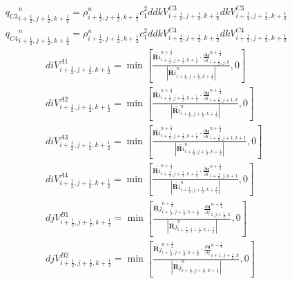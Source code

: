 \begin{enumerate}
\begin{eqnarray}
		{q_{C3}}^{n}_{i+\frac{1}{2},j+\frac{1}{2},k+\frac{1}{2}}=\rho^{n}_{i+\frac{1}{2},j+\frac{1}{2},k+\frac{1}{2}}c_1^2ddkV^{C3}_{i+\frac{1}{2},j+\frac{1}{2},k+\frac{1}{2}}dkV^{C3}_{i+\frac{1}{2},j+\frac{1}{2},k+\frac{1}{2}}\\
		{q_{C4}}^{n}_{i+\frac{1}{2},j+\frac{1}{2},k+\frac{1}{2}}=\rho^{n}_{i+\frac{1}{2},j+\frac{1}{2},k+\frac{1}{2}}c_1^2ddkV^{C4}_{i+\frac{1}{2},j+\frac{1}{2},k+\frac{1}{2}}dkV^{C4}_{i+\frac{1}{2},j+\frac{1}{2},k+\frac{1}{2}}
	\end{eqnarray}
\small
	\begin{eqnarray*}
		&&diV^{A1}_{i+\frac{1}{2},j+\frac{1}{2},k+\frac{1}{2}}=\min{\left[\frac{\bar{\bm Ri}^{n+\frac{1}{2}}_{i+\frac{1}{2},j+\frac{1}{2},k+\frac{1}{2}}\cdot{\frac{\partial \bm u}{\partial i}}^{n+\frac{1}{2}}_{i+\frac{1}{2},j,k}}{\left|\bar{\bm Ri}^n_{i+\frac{1}{2},j+\frac{1}{2},k+\frac{1}{2}}\right|},0\right]}\\
		&&diV^{A2}_{i+\frac{1}{2},j+\frac{1}{2},k+\frac{1}{2}}=\min{\left[\frac{\bar{\bm Ri}^{n+\frac{1}{2}}_{i+\frac{1}{2},j+\frac{1}{2},k+\frac{1}{2}}\cdot{\frac{\partial \bm u}{\partial i}}^{n+\frac{1}{2}}_{i+\frac{1}{2},j+1,k}}{\left|\bar{\bm Ri}^n_{i+\frac{1}{2},j+\frac{1}{2},k+\frac{1}{2}}\right|},0\right]}\\
		&&diV^{A3}_{i+\frac{1}{2},j+\frac{1}{2},k+\frac{1}{2}}=\min{\left[\frac{\bar{\bm Ri}^{n+\frac{1}{2}}_{i+\frac{1}{2},j+\frac{1}{2},k+\frac{1}{2}}\cdot{\frac{\partial \bm u}{\partial i}}^{n+\frac{1}{2}}_{i+\frac{1}{2},j+1,k+1}}{\left|\bar{\bm Ri}^n_{i+\frac{1}{2},j+\frac{1}{2},k+\frac{1}{2}}\right|},0\right]}\\
		&&diV^{A4}_{i+\frac{1}{2},j+\frac{1}{2},k+\frac{1}{2}}=\min{\left[\frac{\bar{\bm Ri}^{n+\frac{1}{2}}_{i+\frac{1}{2},j+\frac{1}{2},k+\frac{1}{2}}\cdot{\frac{\partial \bm u}{\partial i}}^{n+\frac{1}{2}}_{i+\frac{1}{2},j,k+1}}{\left|\bar{\bm Ri}^n_{i+\frac{1}{2},j+\frac{1}{2},k+\frac{1}{2}}\right|},0\right]}\\
		&&djV^{B1}_{i+\frac{1}{2},j+\frac{1}{2},k+\frac{1}{2}}=\min{\left[\frac{\bar{\bm Rj}^{n+\frac{1}{2}}_{i+\frac{1}{2},j+\frac{1}{2},k+\frac{1}{2}}\cdot{\frac{\partial \bm u}{\partial j}}^{n+\frac{1}{2}}_{i,j+\frac{1}{2},k}}{\left|\bar{\bm Rj}^n_{i+\frac{1}{2},j+\frac{1}{2},k+\frac{1}{2}}\right|},0\right]}\\
		&&djV^{B2}_{i+\frac{1}{2},j+\frac{1}{2},k+\frac{1}{2}}=\min{\left[\frac{\bar{\bm Rj}^{n+\frac{1}{2}}_{i+\frac{1}{2},j+\frac{1}{2},k+\frac{1}{2}}\cdot{\frac{\partial \bm u}{\partial j}}^{n+\frac{1}{2}}_{i+1,j+\frac{1}{2},k}}{\left|\bar{\bm Rj}^n_{i+\frac{1}{2},j+\frac{1}{2},k+\frac{1}{2}}\right|},0\right]}\\

\end{eqnarray*}
\end{enumerate}
